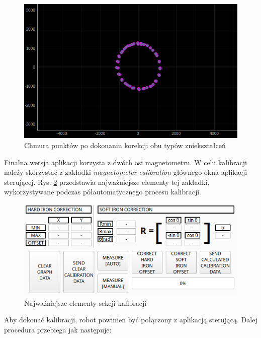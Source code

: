 \begin{figure}[ht]
	\centering
		\includegraphics[width=0.8\linewidth]{rys/ScanBot-11-2d-set-theta-then-sigma-and-done.PNG}
	\caption{Chmura punktów po dokonaniu korekcji obu typów zniekształceń}
	\label{fig:2d-mag-soft-corr-applied}
\end{figure}

Finalna wersja aplikacji korzysta z dwóch osi magnetometru. W celu kalibracji należy skorzystać z zakładki \emph{magnetometer calibration} głównego okna aplikacji sterującej. Rys. \ref{fig:main-app-mag-section-bottom} przedstawia najważniejsze elementy tej zakładki, wykorzystywane podczas półautomatycznego procesu kalibracji.

\begin{figure}[ht]
	\centering
		\includegraphics[width=1\linewidth]{rys/main-app-view-magnetom-bottom.png}
	\caption{Najważniejsze elementy sekcji kalibracji}
	\label{fig:main-app-mag-section-bottom}
\end{figure}

Aby dokonać kalibracji, robot powinien być połączony z aplikacją sterującą. Dalej procedura przebiega jak następuje:

